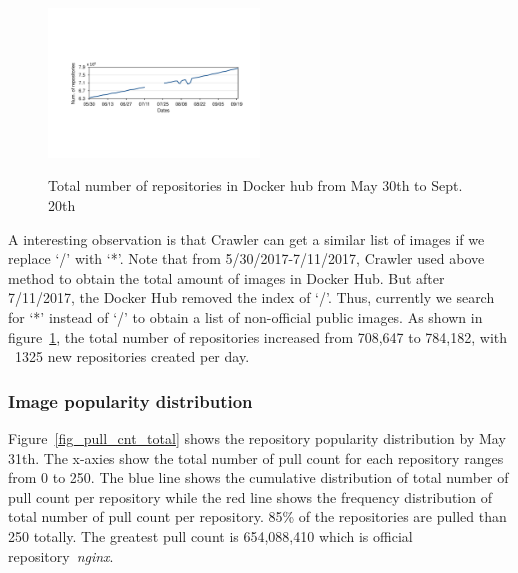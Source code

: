 \begin{figure}
  \centering
  \includegraphics[width=0.5\textwidth]{graphs/image_growth}\\
  \caption{Total number of repositories in Docker hub from May 30th to Sept. 20th}\label{fig_image_growth}
\end{figure}


A interesting observation is that Crawler can get a similar list of images if we replace `/' with `*'. Note that from 5/30/2017-7/11/2017, Crawler used above method to obtain the total amount of images in Docker Hub. But after 7/11/2017, the Docker Hub removed the index of `/'. Thus, currently we search for `*' instead of `/' to obtain a list of non-official public images. As shown in figure~\ref{fig_image_growth}, the total number of repositories increased from 708,647 to 784,182, with ~1325 new repositories created per day.

\subsubsection{Image popularity distribution}


Figure~\ref{fig_pull_cnt_total} shows the repository popularity distribution by May 31th. The x-axies show the total number of pull count for each repository ranges from 0 to 250. The blue line shows the cumulative distribution of total number of pull count per repository while the red line shows the frequency distribution of total number of pull count per repository. 85\% of the repositories are pulled than 250 totally. The greatest pull count is 654,088,410 which is official repository~\textit{nginx}. 

